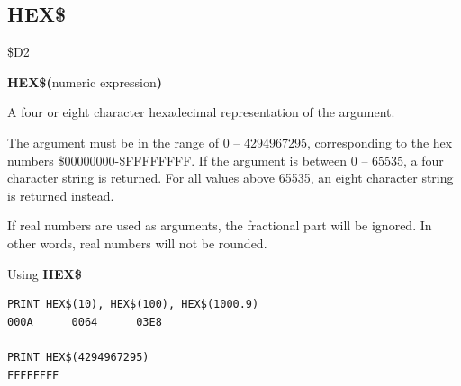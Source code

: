 \subsection{HEX\$}
\begin{description}[leftmargin=2cm,style=nextline]
\item [Token:]    \$D2

\item [Format:]   {\bf HEX\$(}numeric expression{\bf)}

\item [Returns:]  A four or eight character hexadecimal representation of the argument.

                  The argument must be in the range of 0 -- 4294967295, corresponding to the hex numbers \$00000000-\$FFFFFFFF. If the argument is between 0 -- 65535, a four character string is returned. For all values above 65535, an eight character string is returned instead.

\item [Remarks:]  If real numbers are used as arguments, the fractional part will be ignored. In other words, real numbers will not be rounded.

\item [Examples:] Using {\bf HEX\$}

\begin{tcolorbox}[colback=black,coltext=white]
\verbatimfont{\codefont}
\begin{verbatim}
PRINT HEX$(10), HEX$(100), HEX$(1000.9)
000A      0064      03E8

PRINT HEX$(4294967295)
FFFFFFFF
\end{verbatim}
\end{tcolorbox}
\end{description}


\newpage
